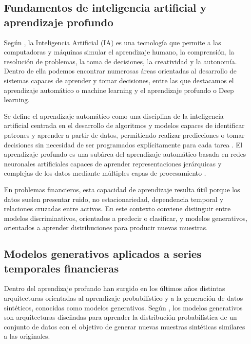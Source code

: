 \documentclass[11pt,a4paper,spanish,oneside]{book}
\numberwithin{equation}{chapter}
\numberwithin{figure}{chapter}
\begin{document}
\subsection{Fundamentos de inteligencia artificial y aprendizaje profundo}

Según , la Inteligencia Artificial (IA) es una tecnología que permite a las computadoras y máquinas simular el aprendizaje humano, la comprensión, la resolución de problemas, la toma de decisiones, la creatividad y la autonomía. Dentro de ella podemos encontrar numerosas áreas orientadas al desarrollo de sistemas capaces de aprender y tomar decisiones, entre las que destacamos el aprendizaje automático o machine learning y el aprendizaje profundo o Deep learning.

Se define el aprendizaje automático como una disciplina de la inteligencia artificial centrada en el desarrollo de algoritmos y modelos capaces de identificar patrones y aprender a partir de datos, permitiendo realizar predicciones o tomar decisiones sin necesidad de ser programados explícitamente para cada tarea \cite{Bishop2006}. El aprendizaje profundo es una subárea del aprendizaje automático basada en redes neuronales artificiales capaces de aprender representaciones jerárquicas y complejas de los datos mediante múltiples capas de procesamiento \cite{Goodfellow2016}.

En problemas financieros, esta capacidad de aprendizaje resulta útil porque los datos suelen presentar ruido, no estacionariedad, dependencia temporal y relaciones cruzadas entre activos. En este contexto conviene distinguir entre modelos discriminativos, orientados a predecir o clasificar, y modelos generativos, orientados a aprender distribuciones para producir nuevas muestras.

\subsection{Modelos generativos aplicados a series temporales financieras}

Dentro del aprendizaje profundo han surgido en los últimos años distintas arquitecturas orientadas al aprendizaje probabilístico y a la generación de datos sintéticos, conocidas como modelos generativos. Según , los modelos generativos son arquitecturas diseñadas para aprender la distribución probabilística de un conjunto de datos con el objetivo de generar nuevas muestras sintéticas similares a las originales.
\end{document}

